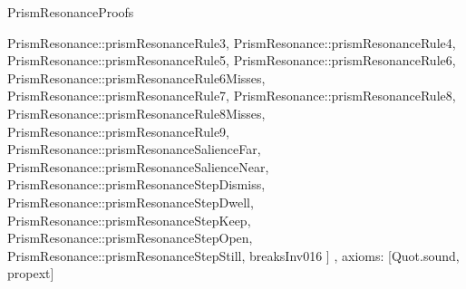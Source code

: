 \begin{lexlean}{PrismResonanceProofs}
\begin{semanticmodule}
{{      PrismResonance::prismResonanceRule3,
      PrismResonance::prismResonanceRule4,
      PrismResonance::prismResonanceRule5,
      PrismResonance::prismResonanceRule6,
      PrismResonance::prismResonanceRule6Misses,
      PrismResonance::prismResonanceRule7,
      PrismResonance::prismResonanceRule8,
      PrismResonance::prismResonanceRule8Misses,
      PrismResonance::prismResonanceRule9,
      PrismResonance::prismResonanceSalienceFar,
      PrismResonance::prismResonanceSalienceNear,
      PrismResonance::prismResonanceStepDismiss,
      PrismResonance::prismResonanceStepDwell,
      PrismResonance::prismResonanceStepKeep,
      PrismResonance::prismResonanceStepOpen,
      PrismResonance::prismResonanceStepStill,
      breaksInv016
    ]
  },
  axioms: [Quot.sound, propext]
}
\end{semanticmodule}
\end{lexlean}
